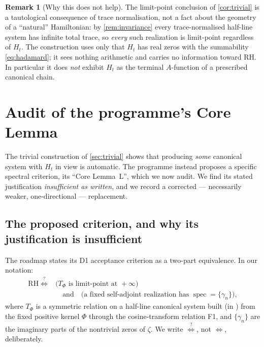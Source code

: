 \documentclass[12pt,a4paper]{amsart}
\theoremstyle{plain}
\theoremstyle{definition}
\newtheorem{remark}[theorem]{Remark}
\begin{document}
\begin{remark}[Why this does not help]\label{rem:trivial-weak}
  The limit-point conclusion of \cref{cor:trivial} is a tautological
  consequence of trace normalisation, not a fact about the geometry of a
  ``natural'' Hamiltonian: by \cref{rem:invariance} every
  trace-normalised half-line system has infinite total trace, so
  \emph{every} such realization is limit-point regardless of $H_t$.  The
  construction uses only that $H_t$ has real zeros with the summability
  \cref{eq:hadamard}; it sees nothing arithmetic and carries no
  information toward RH.  In particular it does \emph{not} exhibit $H_t$
  as the terminal $A$-function of a prescribed canonical chain.
\end{remark}

\section{Audit of the programme's Core Lemma}
\label{sec:open}

The trivial construction of \cref{sec:trivial} shows that producing
\emph{some} canonical system with $H_t$ in view is automatic.  The
programme \cite{SpecRoadmap} instead proposes a specific spectral
criterion, its ``Core Lemma~L'', which we now audit.  We find its stated
justification \emph{insufficient as written}, and we record a corrected
--- necessarily weaker, one-directional --- replacement.

\subsection{The proposed criterion, and why its justification is insufficient}

The roadmap \cite{SpecRoadmap} states its D1 acceptance criterion as a two-part
equivalence.  In our notation:
\begin{equation}\label{eq:coreL}
  \begin{aligned}
  \text{RH}\;\stackrel{?}{\Longleftrightarrow}\;
  &\bigl(T_\Phi\text{ is limit-point at }+\infty\bigr)\\
  &\quad\text{and}\quad
  \bigl(\text{a fixed self-adjoint realization has }
        \operatorname{spec}=\{\gamma_n\}\bigr),
  \end{aligned}
\end{equation}
where $T_\Phi$ is a symmetric relation on a half-line canonical system
built (in \cite{SpecRoadmap}) from the fixed positive kernel $\Phi$
through the cosine-transform relation F1, and $\{\gamma_n\}$ are the
imaginary parts of the nontrivial zeros of $\zeta$.  We write
$\stackrel{?}{\Longleftrightarrow}$, not $\iff$, deliberately.
\end{document}
